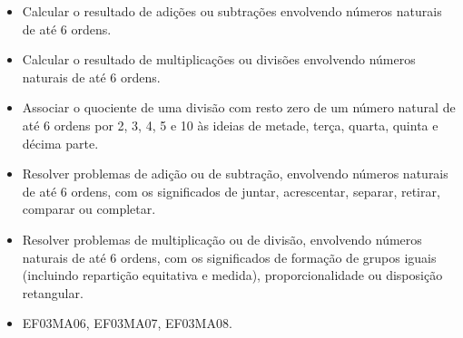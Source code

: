 \begin{itemize}
\item Calcular o resultado de adições ou subtrações envolvendo números
naturais de até 6 ordens.

\item Calcular o resultado de multiplicações ou divisões envolvendo números
naturais de até 6 ordens.

\item Associar o quociente de uma divisão com resto zero de um número
natural de até 6 ordens por 2, 3, 4, 5 e 10 às ideias de metade, terça,
quarta, quinta e décima parte.

\item Resolver problemas de adição ou de subtração, envolvendo números
naturais de até 6 ordens, com os significados de juntar, acrescentar,
separar, retirar, comparar ou completar.

\item Resolver problemas de multiplicação ou de divisão, envolvendo números
naturais de até 6 ordens, com os significados de formação de grupos
iguais (incluindo repartição equitativa e medida), proporcionalidade ou
disposição retangular.
\end{itemize}


\begin{itemize}
\item EF03MA06, EF03MA07, EF03MA08.
\end{itemize}


